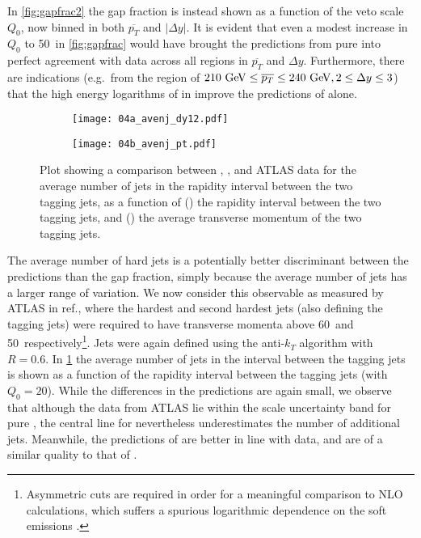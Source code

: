 In \cref{fig:gapfrac2} the gap fraction is instead shown as a function of the 
veto scale $Q_0$, now binned in both $\overline{p_T}$ and $|\Delta y|$.
It is evident that even a modest increase in $Q_0$ to 50\GeV\ in \cref{fig:gapfrac}
would have brought the predictions
from pure \HEJ into perfect agreement with data across all regions in
$\overline{p_T}	$ and $\Delta y$. Furthermore, there are indications (e.g.~from the
region of
$210\GeV\le\overline{p_T}\le240\GeV, 2\le\Delta y\le3$) that
the high energy logarithms of \HEJ in \HEJpy improve the predictions of \py
alone. 



\begin{figure}[t]
  \centering
  \begin{subfigure}[t]{0.495\linewidth}
   \texttt{[image: 04a\_avenj\_dy12.pdf]}
    \caption{}
    \label{fig:avgjets20GeVHardestDY}
  \end{subfigure}
  \begin{subfigure}[t]{0.495\linewidth}
\texttt{[image: 04b\_avenj\_pt.pdf]}
    \caption{}
    \label{fig:avgjets20GeVHardestPT}
  \end{subfigure}
  \caption{Plot showing a comparison between \HEJ, \py, \HEJpy  and ATLAS data \cite{Aad:2014pua} for
  the average number of jets in the rapidity interval between the two tagging jets, as a
    function of  () the rapidity interval
    between the two tagging jets, and () the
    average transverse momentum of the two tagging jets.}
    \label{fig:avgjets20GeVHardest}
\end{figure}

The average number of hard jets is a potentially better discriminant between
the predictions than the gap fraction, simply because the average number of
jets has a larger range of variation. We now consider this observable as measured
by ATLAS in ref.\@  \cite{Aad:2014pua}, where the hardest and second hardest jets 
(also defining the tagging jets)
were required to have transverse momenta above 60\GeV\ and 50\GeV\ respectively\footnote{
Asymmetric cuts are required in order for a meaningful
  comparison to NLO calculations, which suffers a spurious logarithmic
  dependence on the soft
  emissions \cite{Frixione:1997ks}.}.
Jets were again defined using the anti-$k_T$ algorithm with $R=0.6$.
In \cref{fig:avgjets20GeVHardestDY} the average number of jets in the interval between
the tagging jets is shown as a function of 
the rapidity interval between the tagging jets (with $Q_0 = 20$\GeV).
While the differences in the predictions are again small, we observe
that although the data from ATLAS lie within the scale uncertainty band for 
pure \HEJ, the central line for \HEJ nevertheless underestimates the 
number of additional jets. Meanwhile, the predictions of \HEJpy are better in line with data, and
are of a similar quality to that of \py. 

